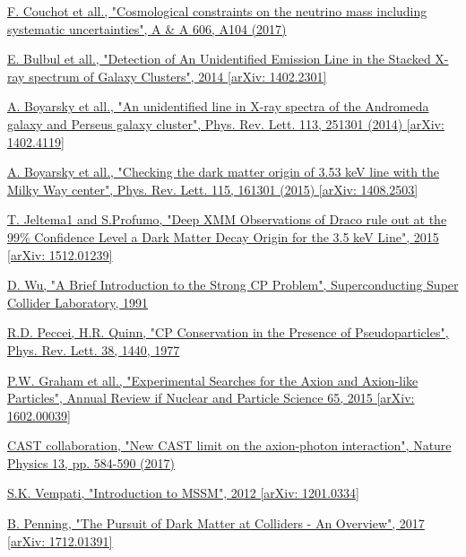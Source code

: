 \documentclass[a4paper, 10pt, openright]{report}
\begin{document}
\begin{thebibliography}{1}
\href{https://www.aanda.org/articles/aa/pdf/2017/10/aa30927-17.pdf}{F. Couchot et all.,
"Cosmological constraints on the neutrino mass including systematic uncertainties",
A \& A 606, A104 (2017)
}

\href{https://arxiv.org/abs/1402.2301}{E. Bulbul et all.,
"Detection of An Unidentified Emission Line in the Stacked X-ray spectrum of Galaxy Clusters",
2014 [arXiv: 1402.2301]
}

\href{https://arxiv.org/abs/1402.4119}{A. Boyarsky et all.,
"An unidentified line in X-ray spectra of the Andromeda galaxy and Perseus galaxy cluster",
Phys. Rev. Lett. 113, 251301 (2014) [arXiv: 1402.4119]
}

\href{https://arxiv.org/abs/1408.2503}{A. Boyarsky et all.,
"Checking the dark matter origin of 3.53 keV line with the Milky Way center",
Phys. Rev. Lett. 115, 161301 (2015) [arXiv: 1408.2503]
}

\href{https://arxiv.org/abs/1512.01239}{T. Jeltema1 and S.Profumo,
"Deep XMM Observations of Draco rule out at the 99\% Confidence Level a Dark Matter Decay Origin for the 3.5 keV Line",
2015 [arXiv: 1512.01239]
}

\href{https://www.osti.gov/servlets/purl/6260191}{D. Wu,
"A Brief Introduction to the Strong CP Problem",
Superconducting Super Collider Laboratory, 1991
}

\href{https://journals.aps.org/prl/abstract/10.1103/PhysRevLett.38.1440}{R.D. Peccei, H.R. Quinn,
"CP Conservation in the Presence of Pseudoparticles",
Phys. Rev. Lett. 38, 1440, 1977
}

\href{https://arxiv.org/abs/1602.00039}{P.W. Graham et all.,
"Experimental Searches for the Axion and Axion-like Particles",
Annual Review if Nuclear and Particle Science 65, 2015 [arXiv: 1602.00039]
}

\href{https://www.nature.com/articles/nphys4109}{CAST collaboration,
"New CAST limit on the axion-photon interaction",
Nature Physics 13, pp. 584-590 (2017)
}

\href{https://arxiv.org/abs/1201.0334}{S.K. Vempati,
"Introduction to MSSM",
2012 [arXiv: 1201.0334]}

\href{https://arxiv.org/abs/1712.01391}{B. Penning,
"The Pursuit of Dark Matter at Colliders - An Overview",
2017 [arXiv: 1712.01391]
}


\end{thebibliography}
\end{document}
